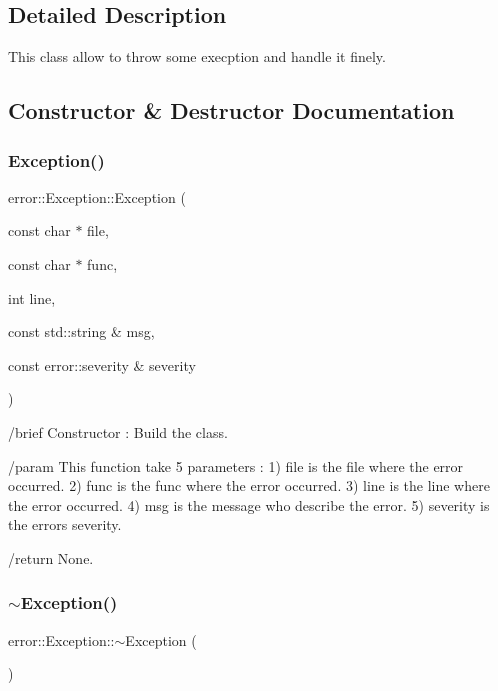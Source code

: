 \subsection{Detailed Description}
This class allow to throw some execption and handle it finely. 

\subsection{Constructor \& Destructor Documentation}
\mbox{\label{classerror_1_1Exception_a7f444a1aa89266d62f5d17b13442afaf}} 
\subsubsection{\texorpdfstring{Exception()}{Exception()}}
{\footnotesize\ttfamily error\+::\+Exception\+::\+Exception (\begin{DoxyParamCaption}\item[{const char $\ast$}]{file,  }\item[{const char $\ast$}]{func,  }\item[{int}]{line,  }\item[{const std\+::string \&}]{msg,  }\item[{const error\+::severity \&}]{severity }\end{DoxyParamCaption})}



/brief Constructor \+: Build the class. 

/param This function take 5 parameters \+: 1) \textquotesingle{}file\textquotesingle{} is the file where the error occurred. 2) \textquotesingle{}func\textquotesingle{} is the func where the error occurred. 3) \textquotesingle{}line\textquotesingle{} is the line where the error occurred. 4) \textquotesingle{}msg\textquotesingle{} is the message who describe the error. 5) \textquotesingle{}severity\textquotesingle{} is the error\textquotesingle{}s severity.

/return None. \mbox{\label{classerror_1_1Exception_a1350d8f9d039facfd991b6782387eae5}} 
\subsubsection{\texorpdfstring{$\sim$\+Exception()}{~Exception()}}
{\footnotesize\ttfamily error\+::\+Exception\+::$\sim$\+Exception (\begin{DoxyParamCaption}{ }\end{DoxyParamCaption})}



